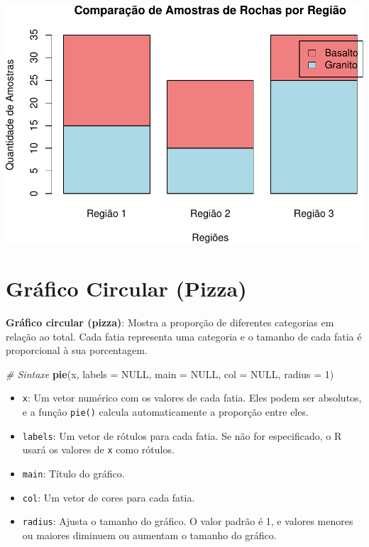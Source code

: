 \documentclass[
]{book}
\newenvironment{Shaded}{\begin{snugshade}}{\end{snugshade}}
\newcommand{\AttributeTok}[1]{\textcolor[rgb]{0.13,0.29,0.53}{#1}}
\newcommand{\CommentTok}[1]{\textcolor[rgb]{0.56,0.35,0.01}{\textit{#1}}}
\newcommand{\ConstantTok}[1]{\textcolor[rgb]{0.56,0.35,0.01}{#1}}
\newcommand{\DecValTok}[1]{\textcolor[rgb]{0.00,0.00,0.81}{#1}}
\newcommand{\FunctionTok}[1]{\textcolor[rgb]{0.13,0.29,0.53}{\textbf{#1}}}
\newcommand{\NormalTok}[1]{#1}
\providecommand{\tightlist}{%
  \setlength{\itemsep}{0pt}\setlength{\parskip}{0pt}}
\begin{document}
\includegraphics{introR_files/figure-latex/unnamed-chunk-166-1.pdf}

\section{Gráfico Circular (Pizza)}\label{gruxe1fico-circular-pizza}

\textbf{Gráfico circular (pizza)}: Mostra a proporção de diferentes
categorias em relação ao total. Cada fatia representa uma categoria e o
tamanho de cada fatia é proporcional à sua porcentagem.

\begin{Shaded}
\begin{Highlighting}[]
\CommentTok{\# Sintaxe}
\FunctionTok{pie}\NormalTok{(x, }\AttributeTok{labels =} \ConstantTok{NULL}\NormalTok{, }\AttributeTok{main =} \ConstantTok{NULL}\NormalTok{, }\AttributeTok{col =} \ConstantTok{NULL}\NormalTok{, }\AttributeTok{radius =} \DecValTok{1}\NormalTok{)}
\end{Highlighting}
\end{Shaded}

\begin{itemize}
\tightlist
\item
  \texttt{x}: Um vetor numérico com os valores de cada fatia. Eles podem ser absolutos, e a função \texttt{pie()} calcula automaticamente a proporção entre eles.
\item
  \texttt{labels}: Um vetor de rótulos para cada fatia. Se não for especificado, o R usará os valores de \texttt{x} como rótulos.
\item
  \texttt{main}: Título do gráfico.
\item
  \texttt{col}: Um vetor de cores para cada fatia.
\item
  \texttt{radius}: Ajusta o tamanho do gráfico. O valor padrão é 1, e valores menores ou maiores diminuem ou aumentam o tamanho do gráfico.
\end{itemize}
\end{document}

